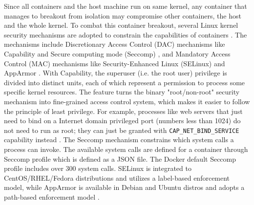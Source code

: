 \documentclass[english,12pt,a4paper,pdftex,sci,utf8]{aaltothesis}
\begin{document}

Since all containers and the host machine run on same kernel, any container that manages to breakout from isolation may compromise other containers, the host and the whole kernel. To combat this container breakout, several Linux kernel security mechanisms are adopted to constrain the capabilities of containers \cite{lin2018measurement}. The mechanisms include Discretionary Access Control (DAC) mechanisms like Capability \cite{manpages-capabilities} and Secure computing mode (Seccomp) \cite{manpages-seccomp}, and Mandatory Access Control (MAC) mechanisms like Security-Enhanced Linux (SELinux) and AppArmor \cite{apparmor}. With Capability, the superuser (i.e. the root user) privilege is divided into distinct units, each of which represent a permission to process some specific kernel resources. The feature turns the binary "root/non-root" security mechanism into fine-grained access control system, which makes it easier to follow the principle of least privilege. For example, processes like web servers that just need to bind on a Internet domain privileged port (numbers less than 1024) do not need to run as root; they can just be granted with \texttt{CAP\_NET\_BIND\_SERVICE} capability instead \cite{docker-security}. The Seccomp mechanism constrains which system calls a process can invoke. The available system calls are defined for a container through Seccomp profile which is defined as a JSON file. The Docker default Seccomp profile \cite{docker-default-seccomp} includes over 300 system calls. SELinux is integrated to CentOS/RHEL/Fedora distributions and utilizes a label-based enforcement model, while AppArmor is available in Debian and Ubuntu distros and adopts a path-based enforcement model \cite{lin2018measurement}.
\end{document}
